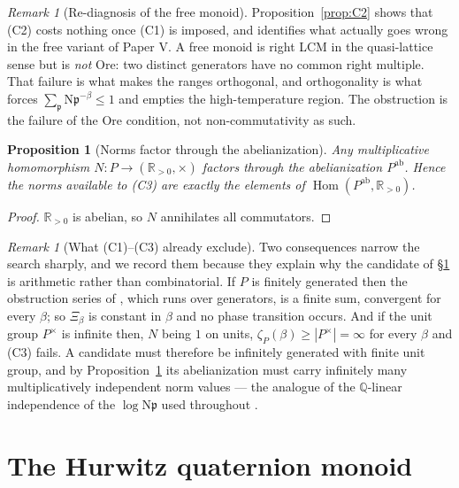 \documentclass[11pt]{amsart}
\numberwithin{equation}{section}
\newtheorem{proposition}[theorem]{Proposition}
\theoremstyle{definition}
\theoremstyle{remark}
\newtheorem{remark}[theorem]{Remark}
\newcommand{\Q}{\mathbb{Q}}
\newcommand{\R}{\mathbb{R}}
\newcommand{\pp}{\mathfrak{p}}
\newcommand{\Ns}{\mathrm{N}}
\begin{document}
\begin{remark}[Re-diagnosis of the free monoid]\label{rem:free}
Proposition~\ref{prop:C2} shows that (C2) costs nothing once (C1) is imposed, and identifies
what actually goes wrong in the free variant of Paper V. A free monoid is right LCM in the
quasi-lattice sense \cite{Nica} but is \emph{not} Ore: two distinct generators have no common right multiple. That
failure is what makes the ranges orthogonal, and orthogonality is what forces
$\sum_\pp\Ns\pp^{-\beta}\le1$ and empties the high-temperature region. The obstruction is the
failure of the Ore condition, not non-commutativity as such.
\end{remark}

\begin{proposition}[Norms factor through the abelianization]\label{prop:ab}
Any multiplicative homomorphism $N:P\to(\R_{>0},\times)$ factors through the abelianization
$P^{\mathrm{ab}}$. Hence the norms available to (C3) are exactly the elements of
$\operatorname{Hom}(P^{\mathrm{ab}},\R_{>0})$.
\end{proposition}

\begin{proof}
$\R_{>0}$ is abelian, so $N$ annihilates all commutators.
\end{proof}

\begin{remark}[What (C1)--(C3) already exclude]\label{rem:selection}
Two consequences narrow the search sharply, and we record them because they explain why the
candidate of \S\ref{sec:hurwitz} is arithmetic rather than combinatorial. If $P$ is finitely
generated then the obstruction series of \cite[(1.1)]{Main}, which runs over generators, is a
finite sum, convergent for every $\beta$; so $\Xi_\beta$ is constant in $\beta$ and no phase
transition occurs. And if the unit group $P^\times$ is infinite then, $N$ being $1$ on units,
$\zeta_P(\beta)\ge|P^\times|=\infty$ for every $\beta$ and (C3) fails. A candidate must
therefore be infinitely generated with finite unit group, and by
Proposition~\ref{prop:ab} its abelianization must carry infinitely many multiplicatively
independent norm values --- the analogue of the $\Q$-linear independence of the $\log\Ns\pp$
used throughout \cite{SeriesI}.
\end{remark}

\section{The Hurwitz quaternion monoid}\label{sec:hurwitz}
\end{document}
